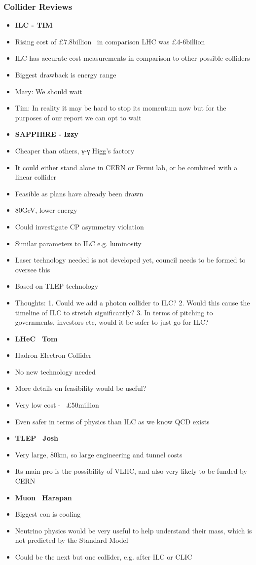 \subsubsection{Collider Reviews}
\begin{itemize}
\item  \textbf{ILC - TIM}
\item  Rising cost of £7.8billion  \textemdash \, in comparison LHC was £4-6billion
\item  ILC has accurate cost measurements in comparison to other possible colliders
\item  Biggest drawback is energy range
\item  Mary: We should wait
\item  Tim: In reality it may be hard to stop its momentum now but for the purposes of our report we can opt to wait
\item  \textbf{SAPPHiRE - Izzy}
\item  Cheaper than others, γ-γ Higg’s factory
\item  It could either stand alone in CERN or Fermi lab, or be combined with a linear collider
\item  Feasible as plans have already been drawn
\item  80GeV, lower energy
\item  Could investigate CP asymmetry violation
\item  Similar parameters to ILC e.g. luminosity
\item  Laser technology needed is not developed yet, council needs to be formed to oversee this
\item  Based on TLEP technology
\item  Thoughts:
1. Could we add a photon collider to ILC?
2. Would this cause the timeline of ILC to stretch significantly?
3. In terms of pitching to governments, investors etc, would it be safer to just go for ILC?
 
\item  \textbf{LHeC  \textemdash \, Tom}
\item  Hadron-Electron Collider
\item  No new technology needed
\item  More details on feasibility would be useful?
\item  Very low cost - ~£50million
\item  Even safer in terms of physics than ILC as we know QCD exists
\item  \textbf{TLEP  \textemdash \, Josh}
\item  Very large, 80km, so large engineering and tunnel costs
\item  Its main pro is the possibility of VLHC, and also very likely to be funded by CERN
\item  \textbf{Muon  \textemdash \, Harapan}
\item  Biggest con is cooling
\item  Neutrino physics would be very useful to help understand their mass, which is not predicted by the Standard Model
\item  Could be the next but one collider, e.g. after ILC or CLIC
\end{itemize}

